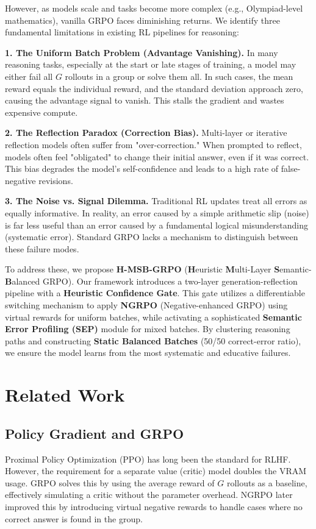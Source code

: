 \documentclass[letterpaper]{article}
\begin{document}
However, as models scale and tasks become more complex (e.g., Olympiad-level mathematics), vanilla GRPO faces diminishing returns. We identify three fundamental limitations in existing RL pipelines for reasoning:

\textbf{1. The Uniform Batch Problem (Advantage Vanishing).} In many reasoning tasks, especially at the start or late stages of training, a model may either fail all $G$ rollouts in a group or solve them all. In such cases, the mean reward equals the individual reward, and the standard deviation approach zero, causing the advantage signal to vanish. This stalls the gradient and wastes expensive compute.

\textbf{2. The Reflection Paradox (Correction Bias).} Multi-layer or iterative reflection models \cite{mgrpo} often suffer from "over-correction." When prompted to reflect, models often feel "obligated" to change their initial answer, even if it was correct. This bias degrades the model's self-confidence and leads to a high rate of false-negative revisions.

\textbf{3. The Noise vs. Signal Dilemma.} Traditional RL updates treat all errors as equally informative. In reality, an error caused by a simple arithmetic slip (noise) is far less useful than an error caused by a fundamental logical misunderstanding (systematic error). Standard GRPO lacks a mechanism to distinguish between these failure modes.

To address these, we propose \textbf{H-MSB-GRPO} (\textbf{H}euristic \textbf{M}ulti-Layer \textbf{S}emantic-\textbf{B}alanced GRPO). Our framework introduces a two-layer generation-reflection pipeline with a \textbf{Heuristic Confidence Gate}. This gate utilizes a differentiable switching mechanism to apply \textbf{NGRPO} (Negative-enhanced GRPO) \cite{ngrpo} using virtual rewards for uniform batches, while activating a sophisticated \textbf{Semantic Error Profiling (SEP)} module for mixed batches. By clustering reasoning paths and constructing \textbf{Static Balanced Batches} (50/50 correct-error ratio), we ensure the model learns from the most systematic and educative failures.

\section{Related Work}

\subsection{Policy Gradient and GRPO}
Proximal Policy Optimization (PPO) \cite{ppo} has long been the standard for RLHF. However, the requirement for a separate value (critic) model doubles the VRAM usage. GRPO \cite{deepseekmath} solves this by using the average reward of $G$ rollouts as a baseline, effectively simulating a critic without the parameter overhead. NGRPO \cite{ngrpo} later improved this by introducing virtual negative rewards to handle cases where no correct answer is found in the group.
\end{document}
